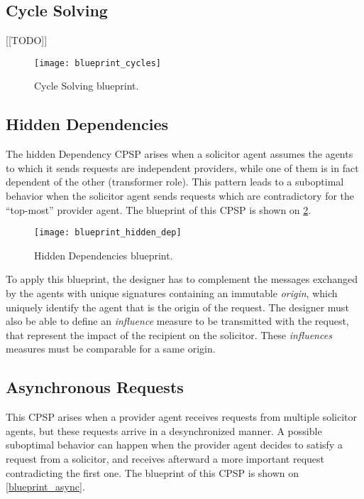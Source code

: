 \subsection{Cycle Solving}

[[TODO]]

\begin{figure}
\centering
\texttt{[image: blueprint\_cycles]}
\caption{Cycle Solving blueprint.}\label{blueprint_cycles}
\end{figure}

\subsection{Hidden Dependencies}

The hidden Dependency CPSP arises when a solicitor agent assumes the agents to which it sends requests are independent providers, while one of them is in fact dependent of the other (transformer role). This pattern leads to a suboptimal behavior when the solicitor agent sends requests which are contradictory for the \enquote{top-most} provider agent. The blueprint of this CPSP is shown on \figurename{} \ref{blueprint_hidden_dep}.

\begin{figure}
\centering
\texttt{[image: blueprint\_hidden\_dep]}
\caption{Hidden Dependencies blueprint.}\label{blueprint_hidden_dep}
\end{figure}

To apply this blueprint, the designer has to complement the messages exchanged by the agents with unique signatures containing an immutable \emph{origin}, which uniquely identify the agent that is the origin of the request. The designer must also be able to define an \emph{influence} measure to be transmitted with the request, that represent the impact of the recipient on the solicitor. These \emph{influences} measures must be comparable for a same origin.

\subsection{Asynchronous Requests}

This CPSP arises when a provider agent receives requests from multiple solicitor agents, but these requests arrive in a desynchronized manner. A possible suboptimal behavior can happen when the provider agent decides to satisfy a request from a solicitor, and receives afterward a more important request contradicting the first one. The blueprint of this CPSP is shown on \figurename{} \ref{blueprint_async}.

